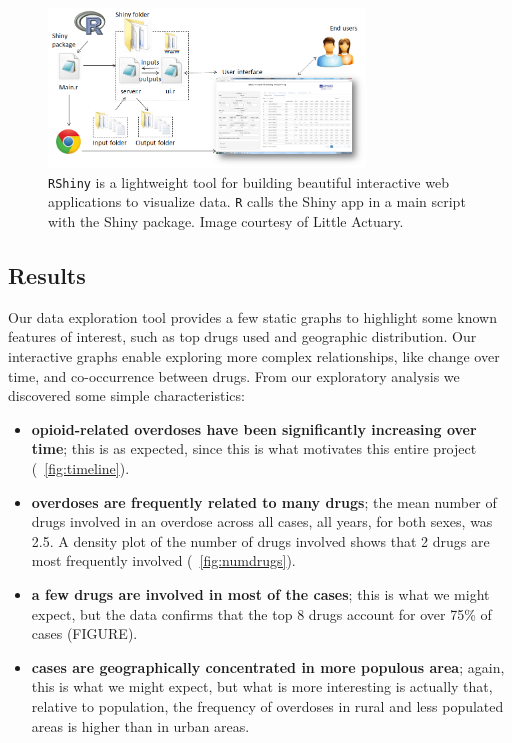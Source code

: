 \documentclass{article}
\begin{document}
\begin{figure}[h]
\centering
\includegraphics[width=0.75\textwidth]{shiny_structure.png}
\caption{\texttt{RShiny} is a lightweight tool for building beautiful interactive web applications to visualize data. \texttt{R} calls the Shiny app in a main script with the Shiny package. Image courtesy of Little Actuary.}
\label{fig:shiny_structure}
\end{figure}
 
\subsection{Results}

Our data exploration tool provides a few static graphs to highlight some known features of interest, such as top drugs used and geographic distribution. Our interactive graphs enable exploring more complex relationships, like change over time, and co-occurrence between drugs. From our exploratory analysis we discovered some simple characteristics:
\begin{itemize}
\item {\bf opioid-related overdoses have been significantly increasing over time}; this is as expected, since this is what motivates this entire project (~\ref{fig:timeline}).
\item {\bf overdoses are frequently related to many drugs}; the mean number of drugs involved in an overdose across all cases, all years, for both sexes, was 2.5. A density plot of the number of drugs involved shows that 2 drugs are most frequently involved (~\ref{fig:numdrugs}).
\item {\bf a few drugs are involved in most of the cases}; this is what we might expect, but the data confirms that the top 8 drugs account for over 75\% of cases (FIGURE).
\item {\bf cases are geographically concentrated in more populous area}; again, this is what we might expect, but what is more interesting is actually that, relative to population, the frequency of overdoses in rural and less populated areas is higher than in urban areas.
\end{itemize}
\end{document}

